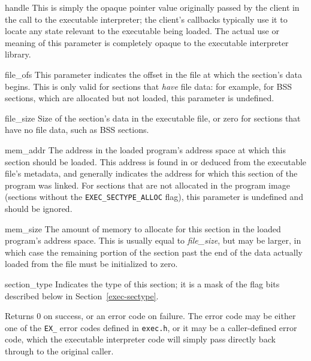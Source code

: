 \begin{apiparm}
	\item[handle]
		This is simply the opaque pointer value
		originally passed by the client
		in the call to the executable interpreter;
		the client's callbacks typically use it
		to locate any state relevant to the executable being loaded.
		The actual use or meaning of this parameter
		is completely opaque to the executable interpreter library.
	\item[file_ofs]
		This parameter indicates
		the offset in the file
		at which the section's data begins.
		This is only valid for sections that \emph{have} file data:
		for example, for BSS sections,
		which are allocated but not loaded,
		this parameter is undefined.
	\item[file_size]
		Size of the section's data in the executable file,
		or zero for sections that have no file data,
		such as BSS sections.
	\item[mem_addr]
		The address in the loaded program's address space
		at which this section should be loaded.
		This address is found in or deduced from
		the executable file's metadata,
		and generally indicates the address
		for which this section of the program was linked.
		For sections that are not allocated in the program image
		(sections without the \texttt{EXEC_SECTYPE_ALLOC} flag),
		this parameter is undefined and should be ignored.
	\item[mem_size]
		The amount of memory to allocate for this section
		in the loaded program's address space.
		This is usually equal to \emph{file_size},
		but may be larger,
		in which case the remaining portion of the section
		past the end of the data actually loaded from the file
		must be initialized to zero.
	\item[section_type]
		Indicates the type of this section;
		it is a mask of the flag bits
		described below in Section~\ref{exec-sectype}.
\end{apiparm}
\begin{apiret}
	Returns 0 on success,
	or an error code on failure.
	The error code may be either
	one of the \texttt{EX_} error codes
	defined in \texttt{exec.h},
	or it may be a caller-defined error code,
	which the executable interpreter code
	will simply pass directly back through to the original caller.
\end{apiret}


